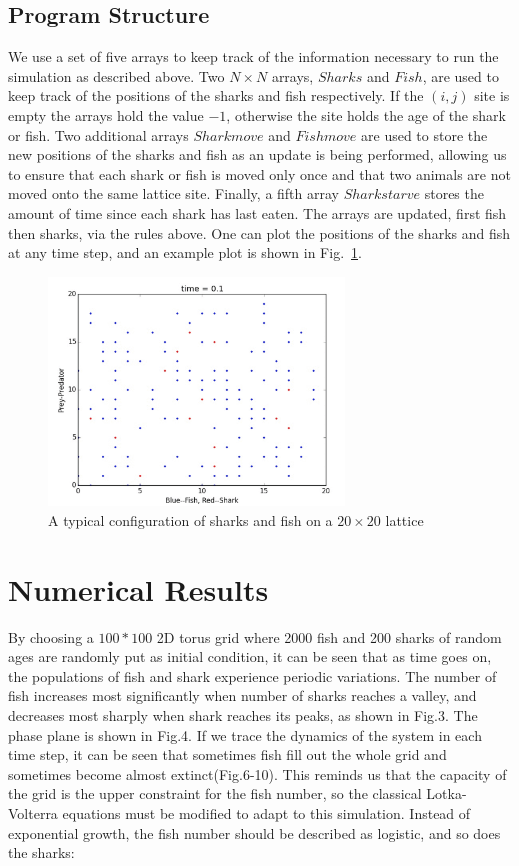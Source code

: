 \documentclass[aps,prl,preprint,superscriptaddress]{revtex4}
\begin{document}
\subsection{Program Structure}
We use a set of five arrays to keep track of the information necessary to run the simulation as described above. Two $N \times N$ arrays, $Sharks$ and $Fish$, are used to keep track of the positions of the sharks and fish respectively. If the $(i,j)$ site is empty the arrays hold the value $-1$, otherwise the site holds the age of the shark or fish. Two additional arrays $Sharkmove$ and $Fishmove$ are used to store the new positions of the sharks and fish as an update is being performed, allowing us to ensure that each shark or fish is moved only once and that two animals are not moved onto the same lattice site. Finally, a fifth array $Sharkstarve$ stores the amount of time since each shark has last eaten. The arrays are updated, first fish then sharks, via the rules above. One can plot the positions of the sharks and fish at any time step, and an example plot is shown in Fig.~\ref{ex}.

\begin{figure}[H]
	\centering
	\includegraphics[width = 0.7\textwidth]{example}
	\caption{A typical configuration of sharks and fish on a $20 \times 20$ lattice}
	\label{ex} 
\end{figure}


\section{Numerical Results}

By choosing a $100*100$ 2D torus grid where 2000 fish and 200 sharks of random ages are randomly put as initial condition, it can be seen that as time goes on, the populations of fish and shark experience periodic variations. The number of fish increases most significantly when number of sharks reaches a valley, and decreases most sharply when shark reaches its peaks, as shown in Fig.3. The phase plane is shown in Fig.4. If we trace the dynamics of the system in each time step, it can be seen that sometimes fish fill out the whole grid and sometimes become almost extinct(Fig.6-10). This reminds us that the capacity of the grid is the upper constraint for the fish number, so the classical Lotka-Volterra equations must be modified to adapt to this simulation. Instead of exponential growth, the fish number should be described as logistic, and so does the sharks:
\end{document}
